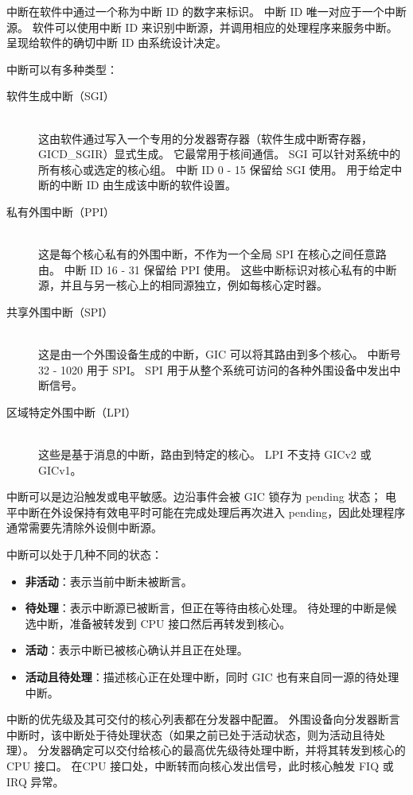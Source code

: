 中断在软件中通过一个称为中断 ID 的数字来标识。
中断 ID 唯一对应于一个中断源。
软件可以使用中断 ID 来识别中断源，并调用相应的处理程序来服务中断。
呈现给软件的确切中断 ID 由系统设计决定。

中断可以有多种类型：

\begin{description}
  \item[{软件生成中断（SGI）}] \hfill \\
    这由软件通过写入一个专用的分发器寄存器（软件生成中断寄存器，GICD\_SGIR）显式生成。
    它最常用于核间通信。
    SGI 可以针对系统中的所有核心或选定的核心组。
    中断 ID 0 - 15 保留给 SGI 使用。
    用于给定中断的中断 ID 由生成该中断的软件设置。
  \item[{私有外围中断（PPI）}] \hfill \\
    这是每个核心私有的外围中断，不作为一个全局 SPI 在核心之间任意路由。
    中断 ID 16 - 31 保留给 PPI 使用。
    这些中断标识对核心私有的中断源，并且与另一核心上的相同源独立，例如每核心定时器。
  \item[{共享外围中断（SPI）}] \hfill \\
    这是由一个外围设备生成的中断，GIC 可以将其路由到多个核心。
    中断号 32 - 1020 用于 SPI。
    SPI 用于从整个系统可访问的各种外围设备中发出中断信号。
  \item[{区域特定外围中断（LPI）}] \hfill \\
    这些是基于消息的中断，路由到特定的核心。
    LPI 不支持 GICv2 或 GICv1。
\end{description}

中断可以是边沿触发或电平敏感。边沿事件会被 GIC 锁存为 pending 状态；
电平中断在外设保持有效电平时可能在完成处理后再次进入 pending，因此处理程序通常需要先清除外设侧中断源。

中断可以处于几种不同的状态：

\begin{itemize}
\item
  \textbf{非活动}：表示当前中断未被断言。
\item
  \textbf{待处理}：表示中断源已被断言，但正在等待由核心处理。
  待处理的中断是候选中断，准备被转发到 CPU 接口然后再转发到核心。
\item
  \textbf{活动}：表示中断已被核心确认并且正在处理。
\item
  \textbf{活动且待处理}：描述核心正在处理中断，同时 GIC 也有来自同一源的待处理中断。
\end{itemize}

中断的优先级及其可交付的核心列表都在分发器中配置。
外围设备向分发器断言中断时，该中断处于待处理状态（如果之前已处于活动状态，则为活动且待处理）。
分发器确定可以交付给核心的最高优先级待处理中断，并将其转发到核心的 CPU 接口。
在CPU 接口处，中断转而向核心发出信号，此时核心触发 FIQ 或 IRQ 异常。

